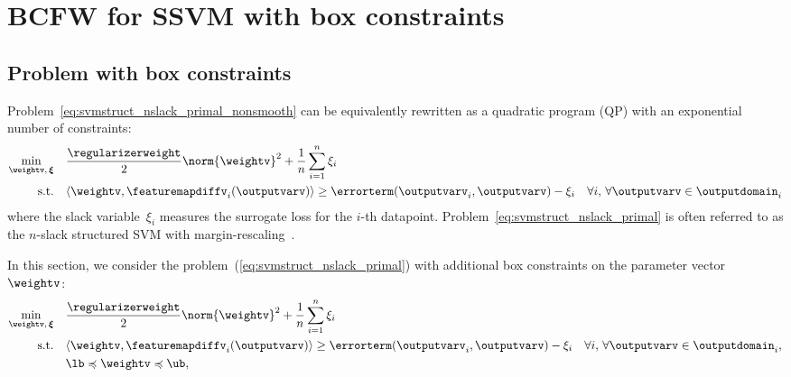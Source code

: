 \documentclass{article}
\begin{document}
\section{BCFW for SSVM with box constraints}
\label{app:pos_const}

\subsection{Problem with box constraints}
Problem~\eqref{eq:svmstruct_nslack_primal_nonsmooth} can be equivalently rewritten as a quadratic program (QP) with an exponential number of constraints:
\begin{align}
    \label{eq:svmstruct_nslack_primal}
    \min_{\weightv,\, \bm{\xi}} \quad &   \frac{\regularizerweight}{2}\norm{\weightv}^2 +
    \frac1n \sum_{i=1}^n \xi_i\\
    \text{s.t.} \quad &
    \langle \weightv, \featuremapdiffv_i(\outputvarv) \rangle
    \geq \errorterm(\outputvarv_i,\outputvarv) - \xi_i \quad  \forall i, \, \forall \outputvarv \in \outputdomain_i
      \notag
\end{align}
where the slack variable~$\xi_i$ measures the surrogate loss for the $i$-th datapoint.
Problem~\eqref{eq:svmstruct_nslack_primal} is often referred to as the $n$-slack structured SVM with margin-rescaling~\citep[Optimization Problem 2]{Joachims:2009ex}.

In this section, we consider the problem~(\ref{eq:svmstruct_nslack_primal}) with additional box constraints on the parameter vector~$\weightv$:
\begin{align}
    \label{eq:ssvn_nslack_primal_bounded}
    \min_{\weightv,\, \bm{\xi}} \quad &   \frac{\regularizerweight}{2}\norm{\weightv}^2 +
    \frac1n \sum_{i=1}^n \xi_i\\
    \text{s.t.} \quad &
    \langle \weightv, \featuremapdiffv_i(\outputvarv) \rangle
    \geq \errorterm(\outputvarv_i,\outputvarv) - \xi_i \quad  \forall i, \, \forall \outputvarv \in  \outputdomain_i, \notag \\
    \quad & \lb \preccurlyeq \weightv \preccurlyeq \ub
      \notag,
\end{align}
\end{document}
